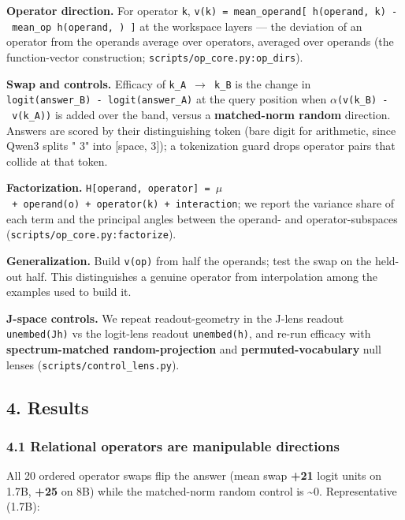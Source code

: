 \textbf{Operator direction.} For operator \texttt{k},
\texttt{v(k)\ =\ mean\_operand{[}\ h(operand,\ k)\ -\ mean\_op\ h(operand,\ \textperiodcentered{})\ {]}}
at the workspace layers --- the deviation of an operator from the
operand\textquotesingle s average over operators, averaged over operands
(the function-vector construction;
\texttt{scripts/op\_core.py:op\_dirs}).

\textbf{Swap and controls.} Efficacy of \texttt{k\_A\ \ensuremath{\to}\ k\_B} is the
change in \texttt{logit(answer\_B)\ -\ logit(answer\_A)} at the query
position when \texttt{\ensuremath{\alpha}\textperiodcentered{}(v(k\_B)\ -\ v(k\_A))} is added over the band,
versus a \textbf{matched-norm random} direction. Answers are scored by
their distinguishing token (bare digit for arithmetic, since Qwen3
splits " 3" into {[}space, 3{]}); a tokenization guard drops operator
pairs that collide at that token.

\textbf{Factorization.}
\texttt{H{[}operand,\ operator{]}\ =\ \ensuremath{\mu}\ +\ operand(o)\ +\ operator(k)\ +\ interaction};
we report the variance share of each term and the principal angles
between the operand- and operator-subspaces
(\texttt{scripts/op\_core.py:factorize}).

\textbf{Generalization.} Build \texttt{v(op)} from half the operands;
test the swap on the held-out half. This distinguishes a genuine
operator from interpolation among the examples used to build it.

\textbf{J-space controls.} We repeat readout-geometry in the J-lens
readout \texttt{unembed(J\textperiodcentered{}h)} vs the logit-lens readout
\texttt{unembed(h)}, and re-run efficacy with \textbf{spectrum-matched
random-projection} and \textbf{permuted-vocabulary} null lenses
(\texttt{scripts/control\_lens.py}).

\subsection{4. Results}\label{4-results}

\subsubsection{4.1 Relational operators are manipulable
directions}\label{41-relational-operators-are-manipulable-directions}

All 20 ordered operator swaps flip the answer (mean swap \textbf{+21}
logit units on 1.7B, \textbf{+25} on 8B) while the matched-norm random
control is \textasciitilde0. Representative (1.7B):

